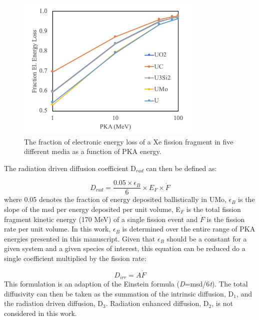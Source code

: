 \documentclass[review]{elsarticle}
\begin{document}
\begin{figure}[h]
 \centering
 \includegraphics[width=0.8\textwidth]{2_el_energy_loss.png} 
 \caption{The fraction of electronic energy loss of a Xe fission fragment in five different media as a function of PKA energy.}
 \label{fig:eloss}
\end{figure} 

The radiation driven diffusion coefficient D$_{rad}$ can then be defined as:

\begin{equation}
\label{eq:1}
D_{rad} = \frac{0.05 \times \epsilon_{B}}{6} \times E_{F} \times \dot F
\end{equation} where 0.05 denotes the fraction of energy deposited ballistically in UMo, $\epsilon_B$ is the slope of the msd per energy deposited per unit volume, E$_F$ is the total fission fragment kinetic energy (170 MeV) of a single fission event and $\dot F$ is the fission rate per unit volume. In this work, $\epsilon_B$ is determined over the entire range of PKA energies presented in this manuscript. Given that $\epsilon_B$ should be a constant for a given system and a given species of interest, this equation can be reduced do a single coefficient multiplied by the fission rate:

\begin{equation}
\label{eq:2}
D_{irr} = A \dot{F} 
\end{equation} This formulation is an adaption of the Einstein formula (\textit{D}=msd/6\textit{t}). The total diffusivity can then be taken as the summation of the intrinsic diffusion, D$_1$, and the radiation driven diffusion, D$_3$. Radiation enhanced diffusion, D$_2$, is not considered in this work.

\FloatBarrier
\end{document}
